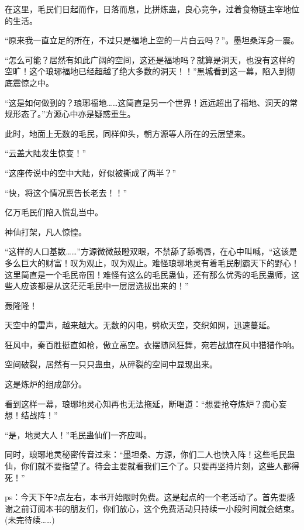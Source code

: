 \begin{this_body}
在这里，毛民们日起而作，日落而息，比拼炼蛊，良心竞争，过着食物链主宰地位的生活。

“原来我一直立足的所在，不过只是福地上空的一片白云吗？”。墨坦桑浑身一震。

“怎么可能？居然有如此广阔的空间，这还是福地吗？就算是洞天，也没有这样的空旷！这个琅琊福地已经超越了绝大多数的洞天！！”黑城看到这一幕，陷入到彻底震惊之中。

“这是如何做到的？琅琊福地……这简直是另一个世界！远远超出了福地、洞天的常规形态了。”方源心中亦是疑惑重生。

此时，地面上无数的毛民，同样仰头，朝方源等人所在的云层望来。

“云盖大陆发生惊变！”

“这座传说中的空中大陆，好似被撕成了两半？”

“快，将这个情况禀告长老去！！”

亿万毛民们陷入慌乱当中。

神仙打架，凡人惊惶。

“这样的人口基数……”方源微微鼓瞪双眼，不禁舔了舔嘴唇，在心中叫喊，“这该是多么巨大的财富！叹为观止，叹为观止。难怪琅琊地灵有着毛民制霸天下的野心！这里简直是一个毛民帝国！难怪有这么的毛民蛊仙，还有那么优秀的毛民蛊师，这些人应该都是从这茫茫毛民中一层层选拔出来的！”

轰隆隆！

天空中的雷声，越来越大。无数的闪电，劈砍天空，交织如网，迅速蔓延。

狂风中，秦百胜挺直如枪，傲立高空。衣摆随风狂舞，宛若战旗在风中猎猎作响。

空间破裂，居然有一只只蛊虫，从碎裂的空间中显现出来。

这是炼炉的组成部分。

看到这样一幕，琅琊地灵心知再也无法拖延，断喝道：“想要抢夺炼炉？痴心妄想！结战阵！”

“是，地灵大人！”毛民蛊仙们一齐应叫。

同时，琅琊地灵秘密传音过来：“墨坦桑、方源，你们二人也快入阵！这些毛民蛊仙，你们就不要指望了。待会主要就看我们三个了。只要再坚持片刻，这些人都得死！”

ps：今天下午2点左右，本书开始限时免费。这是起点的一个老活动了。首先要感谢之前订阅本书的朋友们，你们放心，这个免费活动只持续一小段时间就会结束。(未完待续……)

\end{this_body}

